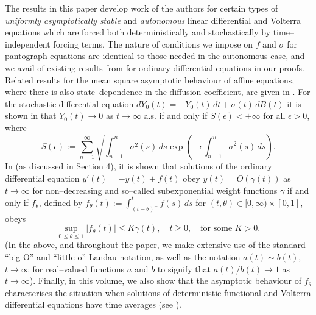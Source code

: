 \documentclass[a4paper,10pt,reqno]{amsart}
\numberwithin{equation}{section}
\theoremstyle{definition}
\theoremstyle{remark}
\DeclareMathOperator{\1}{\mathbbm 1}
\begin{document}
	The results in this paper develop work of the authors for certain types of \textit{uniformly asymptotically stable} and \textit{autonomous} linear differential and Volterra equations which are forced both deterministically and stochastically by time--independent forcing terms.  The nature of conditions we impose on $f$ and $\sigma$ for pantograph equations are identical to those needed in the autonomous case, and we avail of existing results from \cite{AppLaw2024ODE} for ordinary differential equations in our proofs. 
	Related results for the mean square asymptotic behaviour of affine equations, where there is also state--dependence in the diffusion coefficient, are given in  \cite{AL:2023(AppliedNumMath)}. For the stochastic differential equation 
	$
	dY_0(t)=-Y_0(t)\,dt +\sigma(t)\,dB(t)$ it is shown in \cite{ACR:2011(DCDS)} that  $Y_0(t)\to 0$ as $t\to\infty$ a.s.  if and only if $S(\epsilon)<+\infty$ for all $\epsilon>0$, where 
	\begin{equation} \label{eq.S}
		S(\epsilon):= \sum_{n=1}^\infty \sqrt{\int_{n-1}^n\sigma^2(s)\,ds} \exp\left(-\epsilon\int_{n-1}^{n}\sigma^2(s)\,ds\right).
	\end{equation}
	In \cite{AppLaw2024ODE} (as discussed in Section 4), it is shown that solutions of the ordinary differential equation $y'(t)=-y(t)+f(t)$ obey $y(t)=O(\gamma(t))$ as $t\to\infty$ for non--decreasing and so--called subexponential weight functions $\gamma$ if and only if $f_\theta$, defined by  
	$f_\theta(t):=\int_{(t-\theta)^+}^t f(s)\,ds$ for $(t,\theta)\in [0,\infty)\times[0,1]$, obeys
	\begin{equation} 
		\label{eq.fthetagammabdd}
		\sup_{0\leq \theta\leq 1} |f_\theta(t)| \leq K\gamma(t), \quad t\geq 0, \quad \text{for some $K>0$}.
	\end{equation}
	(In the above, and throughout the paper, we make extensive use of the standard ``big O'' and ``little o'' Landau notation, as well as the notation $a(t)\sim b(t)$, $t\to\infty$ for real--valued functions $a$ and $b$ to signify that $a(t)/b(t)\to 1$ as $t\to\infty$).
	Finally, in this volume, we also show that the asymptotic behaviour of $f_\theta$  characterises the situation when solutions of deterministic functional and  Volterra differential equations have time averages (see \cite{AL:2024Cesaro}).  
	
\end{document}
